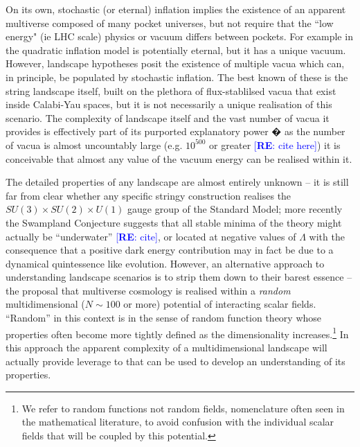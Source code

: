 \documentclass[12pt]{article}
\newcommand{\re}[1]{\textcolor{blue}{[{\bf RE}: #1]}}
\begin{document}
 On its own, stochastic (or eternal) inflation  implies the existence of an apparent multiverse composed of many pocket universes, but not require that the ``low energy" (ie LHC scale) physics or vacuum  differs between pockets. For example in the quadratic inflation model is potentially eternal, but it has a unique vacuum.  However, landscape hypotheses posit the existence of multiple vacua which can, in principle, be populated by stochastic inflation. The best known of these is the string landscape itself, built on the plethora of flux-stablilsed vacua that exist inside Calabi-Yau spaces, but it is not necessarily a unique realisation of this scenario. The complexity of landscape itself and the vast number of vacua it provides is effectively part of its purported explanatory power � as the number of vacua is almost uncountably large (e.g. $10^{500}$ or greater \cite{Douglas}\re{cite here}) it is conceivable that almost any value of the vacuum energy can be realised within it. 
 
 The detailed properties of any landscape are almost entirely unknown -- it is still far from clear whether any specific stringy construction  realises  the $SU(3) \times SU(2) \times U(1)$ gauge group of the Standard Model; more recently the Swampland Conjecture suggests that all stable minima of the theory might actually be ``underwater'' \cite{Agrawal2018}\re{cite}, or located at negative values of $\Lambda$ with the consequence that a positive dark energy contribution may in fact be due to a dynamical quintessence like evolution.   However, an alternative approach to understanding  landscape scenarios is to strip them down to their barest essence -- the proposal that multiverse cosmology is realised within a {\em random\/} multidimensional ($N\sim100$ or more) potential of interacting scalar fields. ``Random'' in this context is  in the sense of random function theory \cite{GRF1, GRF2, GRF3} whose properties often become more tightly defined as the dimensionality increases.\footnote{We refer to random functions not random fields, nomenclature often seen in the mathematical literature, to avoid confusion with the individual scalar fields that will be coupled by this potential.} In this approach  the apparent complexity of a multidimensional landscape will actually provide  leverage to that can be used to develop an understanding of its properties. 
 
\end{document}
